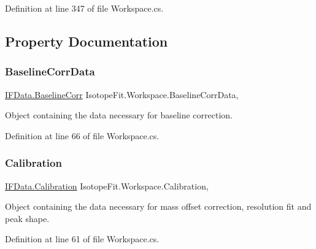 Definition at line 347 of file Workspace.\+cs.



\subsection{Property Documentation}
\mbox{\label{class_isotope_fit_1_1_workspace_a700395fbb329b1a0fcb5932095db066f}} 
\subsubsection{\texorpdfstring{Baseline\+Corr\+Data}{BaselineCorrData}}
{\footnotesize\ttfamily \hyperlink{class_isotope_fit_1_1_i_f_data_1_1_baseline_corr}{I\+F\+Data.\+Baseline\+Corr} Isotope\+Fit.\+Workspace.\+Baseline\+Corr\+Data\hspace{0.3cm}{\ttfamily [get]}, {\ttfamily [set]}}



Object containing the data necessary for baseline correction. 



Definition at line 66 of file Workspace.\+cs.

\mbox{\label{class_isotope_fit_1_1_workspace_a0ed1cfd6701db24de84f4ba67eed0442}} 
\subsubsection{\texorpdfstring{Calibration}{Calibration}}
{\footnotesize\ttfamily \hyperlink{class_isotope_fit_1_1_i_f_data_1_1_calibration}{I\+F\+Data.\+Calibration} Isotope\+Fit.\+Workspace.\+Calibration\hspace{0.3cm}{\ttfamily [get]}, {\ttfamily [set]}}



Object containing the data necessary for mass offset correction, resolution fit and peak shape. 



Definition at line 61 of file Workspace.\+cs.

